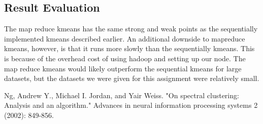 \documentclass[paper=letter, fontsize=11pt]{article}
\numberwithin{equation}{section}		%
\numberwithin{figure}{section}			%
\numberwithin{table}{section}				%
\begin{document}
\subsection{Result Evaluation}
The map reduce kmeans has the same strong and weak points as the sequentially implemented kmeans described earlier. An additional downside to mapreduce kmeans, however, is that it runs more slowly than the sequentially kmeans. This is because of the overhead cost of using hadoop and setting up our node. The map reduce kmeans would likely outperform the sequential kmeans for large datasets, but the datasets we were given for this assignment were relatively small. 
\begin{thebibliography}{1}
Ng, Andrew Y., Michael I. Jordan, and Yair Weiss. "On spectral clustering: Analysis and an algorithm." Advances in neural information processing systems 2 (2002): 849-856.
\end{thebibliography}
\end{document}
